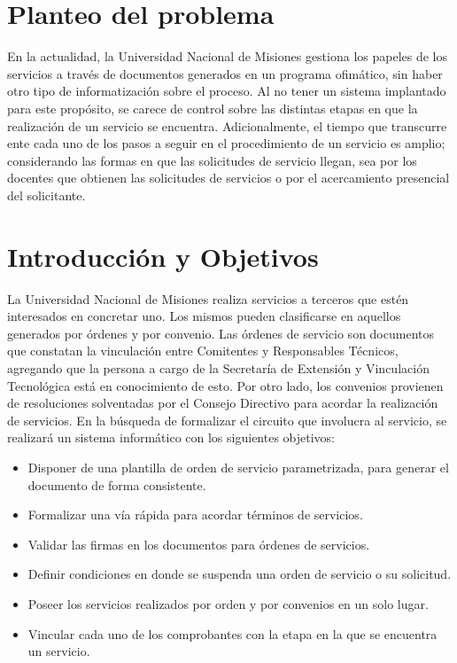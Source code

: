 \section{Planteo del problema}
\normalsize{ \indent
En la actualidad, la Universidad Nacional de Misiones
gestiona los papeles de los servicios a trav\'es
de documentos generados en un programa ofim\'atico,
sin haber otro tipo de informatizaci\'on sobre
el proceso. Al no tener un sistema implantado para
este prop\'osito, se carece de control sobre las
distintas etapas en que la realizaci\'on de un
servicio se encuentra.
}
\newline
\normalsize{ \indent
Adicionalmente, el tiempo que transcurre ente cada
uno de los pasos a seguir en el procedimiento de un
servicio es amplio; considerando las formas en que
las solicitudes de servicio llegan, sea por los
docentes que obtienen las solicitudes de servicios
o por el acercamiento presencial del solicitante.
}
\section{Introducci\'on y Objetivos}
\normalsize{ \indent
La Universidad Nacional de Misiones realiza servicios
a terceros que est\'en interesados en concretar uno.
Los mismos pueden clasificarse en aquellos
generados por \'ordenes y por convenio.
Las \'ordenes de servicio son documentos que
constatan la vinculaci\'on entre Comitentes y
Responsables T\'ecnicos, agregando que la persona
a cargo de la Secretar\'ia de Extensi\'on y
Vinculaci\'on Tecnol\'ogica est\'a en conocimiento
de esto. Por otro lado, los convenios provienen
de resoluciones solventadas por el Consejo Directivo
para acordar la realizaci\'on de servicios.
}
\newline
\normalsize{ \indent
En la b\'usqueda de formalizar el circuito que
involucra al servicio, se realizar\'a un sistema
inform\'atico con los siguientes objetivos:
}
\begin{itemize}
	\item Disponer de una plantilla de orden
	de servicio parametrizada, para generar
	el documento de forma consistente.
	\item Formalizar una v\'ia r\'apida para
	acordar t\'erminos de servicios.
	\item Validar las firmas en los documentos
	para \'ordenes de servicios.
	\item Definir condiciones en donde se
	suspenda una orden de servicio o su
	solicitud.
	\item Poseer los servicios realizados
	por orden y por convenios en un solo
	lugar.
	\item Vincular cada uno de los
	comprobantes con la etapa en la que se
	encuentra un servicio.
\end{itemize}

